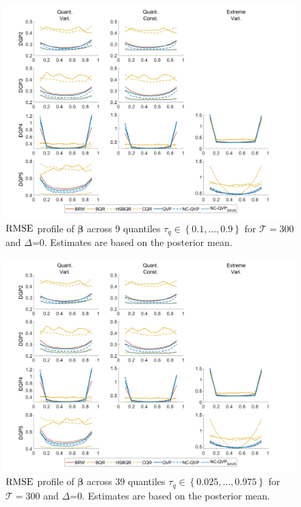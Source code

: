 \begin{figure}[H]
    \centering
    \includegraphics[width=0.9\linewidth]{AppFig/CoeffBiasSpecificv3_Q9.jpg}
    \caption{$\operatorname{RMSE}$ profile of $\boldsymbol{\beta}$ across 9 quantiles $\tau_q \in \left\{0.1,\dotsc,0.9\right\}$ for $\mathcal{T}=300$ and $\varDelta$=0. Estimates are based on the posterior mean.}
    \label{fig:SpecCoeffBias_Q9}
\end{figure}

\begin{figure}[H]
    \centering
    \includegraphics[width=0.9\linewidth]{AppFig/CoeffBiasSpecificv3_Q9.jpg}
    \caption{$\operatorname{RMSE}$ profile of $\boldsymbol{\beta}$ across 39 quantiles $\tau_q \in \left\{0.025,\dotsc,0.975\right\}$ for $\mathcal{T}=300$ and $\varDelta$=0. Estimates are based on the posterior mean.}
    \label{fig:SpecCoeffBias_Q39}
\end{figure}

